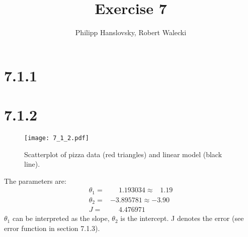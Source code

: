 \documentclass[a4paper,11pt]{article}
\title{Exercise 7}
\author{Philipp Hanslovsky, Robert Walecki}
\theoremstyle{definition}
\theoremstyle{plain}
\theoremstyle{remark}
\begin{document}


\maketitle

\section*{7.1.1}


\section*{7.1.2}
\begin{figure}[H]
\centering
\texttt{[image: 7\_1\_2.pdf]}
\caption{Scatterplot of pizza data (red triangles) and linear model (black line).}
\label{fig:pizza}
\end{figure}

The parameters are:
\begin{align}
\theta_1 =& \;\;\;\:\,1.193034 \approx \;\;\:1.19 \label{eq:slope} \\
\theta_2 =& -3.895781 \approx -3.90 \label{eq:offset} \\
J =& \;\;\;\:\,4.476971 \label{eq:J}
\end{align}
$\theta_1$ can be interpreted as the slope, $\theta_2$ is the intercept. J denotes the error (see error function in section 7.1.3).
\end{document}
